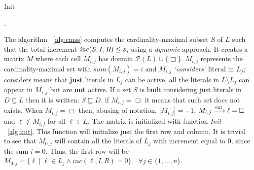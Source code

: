 \begin{algorithm}[H]\small
    \caption{Init}
        \label{alg:init}
        .
\end{algorithm}

The algorithm ~\ref{alg:cmss} computes the cardinality-maximal subset $S$ of $L$ such that 
the total increment $\mathit{inc}(S,I,R) \le s$, using a \textit{dynamic} approach.
It creates a matrix $M$ where each cell $M_{i,j}$ has domain $\mathcal{P}(L) \cup \{\Box\}$.
$M_{i,j}$ represents the cardinality-maximal set with $sum(M_{i,j}) = i$ and $M_{i,j}$ \textit{`considers'} 
literal in $L_j$; considers means that \textbf{just} literals in $L_j$ can be active, all the literals 
in $L \setminus L_j$ can appear in $M_{i,j}$ but are \textbf{not} active. 
If a set $S$ is built considering just literals in $D \subseteq L$ then 
it is written: $S \sqsubseteq D$.
if $M_{i,j} = \Box$ it means that such set does not exists.
When $M_{i,j} = \Box$ then, abusing of notation, $|M_{i,j}| = -1$,
$M_{i,j} \xrightarrow{\text{ext}} \ell = \Box$ and $\ell \not\in M_{i,j}$ for all $\ell \in L$.
The matrix is initialized with function \textit{Init} ~\ref{alg:init}.
This function will initialize just the first row and column.
It is trivial to see that $M_{0,j}$ will contain all the literals of $L_j$ 
with increment equal to 0, since the sum $i = 0$.
Thus, the first row will be 
$M_{0,j} = \{ \ell \mid \ell \in L_j \land inc(\ell,I,R) = 0\} \quad \forall j \in \{1, \hdots , n\}$.

